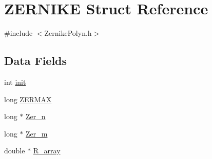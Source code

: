 \hypertarget{structZERNIKE}{\section{Z\+E\+R\+N\+I\+K\+E Struct Reference}
\label{structZERNIKE}
}


{\ttfamily \#include $<$Zernike\+Polyn.\+h$>$}

\subsection*{Data Fields}
\begin{DoxyCompactItemize}
\item 
int \hyperlink{structZERNIKE_aac9ea666bbfdae8b71b4bff01617b2c2}{init}
\item 
long \hyperlink{structZERNIKE_a2c37fde142f459b1374da2472151ee29}{Z\+E\+R\+M\+A\+X}
\item 
long $\ast$ \hyperlink{structZERNIKE_a144847f36a12051560840131c95ddd0e}{Zer\+\_\+n}
\item 
long $\ast$ \hyperlink{structZERNIKE_a5e2bbe4eed60483ff115a9661462cff9}{Zer\+\_\+m}
\item 
double $\ast$ \hyperlink{structZERNIKE_aa9e9284d2a3580d31d3d9b35fa4d2b25}{R\+\_\+array}
\end{DoxyCompactItemize}


